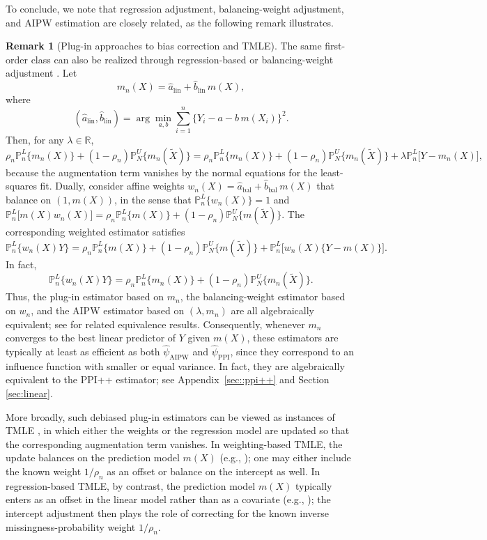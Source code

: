 \documentclass{article}
\theoremstyle{plain}
\theoremstyle{definition}
\newtheorem{remark}{Remark}
\newcommand{\1}{\mathbbm{1}}
\newcommand{\Pl}{\mathbb{P}^{L}_n}
\newcommand{\Pu}{\mathbb{P}^{U}_N}
\begin{document}
  

To conclude, we note that regression adjustment, balancing-weight adjustment, and AIPW estimation are closely related, as the following remark illustrates.

\begin{remark}[Plug-in approaches to bias correction and TMLE]
\label{remark::plugin}
The same first-order class can also be realized through regression-based or balancing-weight adjustment \citep{scharfstein1999adjusting,van2006targeted,rosenblum2009using}. Let
\[
m_n(X)=\hat a_{\mathrm{lin}}+\hat b_{\mathrm{lin}}\,m(X),
\]
where
\[
(\hat a_{\mathrm{lin}},\hat b_{\mathrm{lin}})
=
\arg\min_{a,b}\sum_{i=1}^n \{Y_i-a-b\,m(X_i)\}^2.
\]
Then, for any \(\lambda\in\mathbb{R}\),
\[
\rho_n \Pl\{m_n(X)\}
+
(1-\rho_n)\Pu\{m_n(\widetilde X)\}
=
\rho_n \Pl\{m_n(X)\}
+
(1-\rho_n)\Pu\{m_n(\widetilde X)\}
+
\lambda \Pl\bigl[Y-m_n(X)\bigr],
\]
because the augmentation term vanishes by the normal equations for the least-squares fit. Dually, consider affine weights \(w_n(X)=\hat a_{\mathrm{bal}}+\hat b_{\mathrm{bal}}\,m(X)\) that balance on \((1,m(X))\), in the sense that \(\Pl\{w_n(X)\}=1\) and \(\Pl\bigl[m(X)w_n(X)\bigr]=\rho_n \Pl\{m(X)\}+(1-\rho_n)\Pu\{m(\widetilde X)\}\). The corresponding weighted estimator satisfies
\[
\Pl\bigl\{w_n(X)Y\bigr\}
=
\rho_n \Pl\{m(X)\}
+
(1-\rho_n)\Pu\{m(\widetilde X)\}
+
\Pl\bigl[w_n(X)\{Y-m(X)\}\bigr].
\]
In fact,
\[
\Pl\bigl\{w_n(X)Y\bigr\}
=
\rho_n \Pl\{m_n(X)\}
+
(1-\rho_n)\Pu\{m_n(\widetilde X)\}.
\]
Thus, the plug-in estimator based on \(m_n\), the balancing-weight estimator based on \(w_n\), and the AIPW estimator based on \((\lambda,m_n)\) are all algebraically equivalent; see \citet{chattopadhyay2023implied,bruns2025augmented} for related equivalence results. Consequently, whenever \(m_n\) converges to the best linear predictor of \(Y\) given \(m(X)\), these estimators are typically at least as efficient as both \(\widehat{\psi}_{\mathrm{AIPW}}\) and \(\widehat{\psi}_{\mathrm{PPI}}\), since they correspond to an influence function with smaller or equal variance. In fact, they are algebraically equivalent to the PPI++ estimator; see Appendix~\ref{sec::ppi++} and Section \ref{sec:linear}.

More broadly, such debiased plug-in estimators can be viewed as instances of TMLE \citep{van2006targeted,vanderLaanRose2011}, in which either the weights or the regression model are updated so that the corresponding augmentation term vanishes. In weighting-based TMLE, the update balances on the prediction model \(m(X)\) (e.g., \citealt{hejazi2023revisiting}); one may either include the known weight \(1/\rho_n\) as an offset or balance on the intercept as well. In regression-based TMLE, by contrast, the prediction model \(m(X)\) typically enters as an offset in the linear model rather than as a covariate (e.g., \citealt{lendle2015balancing}); the intercept adjustment then plays the role of correcting for the known inverse missingness-probability weight \(1/\rho_n\).
\end{remark}
\end{document}
